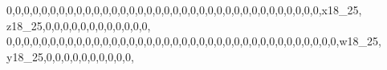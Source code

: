 \documentclass[]{article}
\newenvironment{Shaded}{\begin{snugshade}}{\end{snugshade}}
\newcommand{\DecValTok}[1]{\textcolor[rgb]{0.00,0.00,0.81}{#1}}
\newcommand{\NormalTok}[1]{#1}
\begin{document}
\begin{Shaded}
\begin{Highlighting}[]
\DecValTok{0}\NormalTok{,}\DecValTok{0}\NormalTok{,}\DecValTok{0}\NormalTok{,}\DecValTok{0}\NormalTok{,}\DecValTok{0}\NormalTok{,}\DecValTok{0}\NormalTok{,}\DecValTok{0}\NormalTok{,}\DecValTok{0}\NormalTok{,}\DecValTok{0}\NormalTok{,}\DecValTok{0}\NormalTok{,}\DecValTok{0}\NormalTok{,}\DecValTok{0}\NormalTok{,}\DecValTok{0}\NormalTok{,}\DecValTok{0}\NormalTok{,}\DecValTok{0}\NormalTok{,}\DecValTok{0}\NormalTok{,}\DecValTok{0}\NormalTok{,}\DecValTok{0}\NormalTok{,}\DecValTok{0}\NormalTok{,}\DecValTok{0}\NormalTok{,}\DecValTok{0}\NormalTok{,}\DecValTok{0}\NormalTok{,}\DecValTok{0}\NormalTok{,}\DecValTok{0}\NormalTok{,}\DecValTok{0}\NormalTok{,}\DecValTok{0}\NormalTok{,}\DecValTok{0}\NormalTok{,}\DecValTok{0}\NormalTok{,}\DecValTok{0}\NormalTok{,}\DecValTok{0}\NormalTok{,}\DecValTok{0}\NormalTok{,}\DecValTok{0}\NormalTok{,}\DecValTok{0}\NormalTok{,}\DecValTok{0}\NormalTok{,}\DecValTok{0}\NormalTok{,}\DecValTok{0}\NormalTok{,x18_}\DecValTok{25}\NormalTok{, z18_}\DecValTok{25}\NormalTok{,}\DecValTok{0}\NormalTok{,}\DecValTok{0}\NormalTok{,}\DecValTok{0}\NormalTok{,}\DecValTok{0}\NormalTok{,}\DecValTok{0}\NormalTok{,}\DecValTok{0}\NormalTok{,}\DecValTok{0}\NormalTok{,}\DecValTok{0}\NormalTok{,}\DecValTok{0}\NormalTok{,}\DecValTok{0}\NormalTok{,}\DecValTok{0}\NormalTok{,}\DecValTok{0}\NormalTok{,}
\DecValTok{0}\NormalTok{,}\DecValTok{0}\NormalTok{,}\DecValTok{0}\NormalTok{,}\DecValTok{0}\NormalTok{,}\DecValTok{0}\NormalTok{,}\DecValTok{0}\NormalTok{,}\DecValTok{0}\NormalTok{,}\DecValTok{0}\NormalTok{,}\DecValTok{0}\NormalTok{,}\DecValTok{0}\NormalTok{,}\DecValTok{0}\NormalTok{,}\DecValTok{0}\NormalTok{,}\DecValTok{0}\NormalTok{,}\DecValTok{0}\NormalTok{,}\DecValTok{0}\NormalTok{,}\DecValTok{0}\NormalTok{,}\DecValTok{0}\NormalTok{,}\DecValTok{0}\NormalTok{,}\DecValTok{0}\NormalTok{,}\DecValTok{0}\NormalTok{,}\DecValTok{0}\NormalTok{,}\DecValTok{0}\NormalTok{,}\DecValTok{0}\NormalTok{,}\DecValTok{0}\NormalTok{,}\DecValTok{0}\NormalTok{,}\DecValTok{0}\NormalTok{,}\DecValTok{0}\NormalTok{,}\DecValTok{0}\NormalTok{,}\DecValTok{0}\NormalTok{,}\DecValTok{0}\NormalTok{,}\DecValTok{0}\NormalTok{,}\DecValTok{0}\NormalTok{,}\DecValTok{0}\NormalTok{,}\DecValTok{0}\NormalTok{,}\DecValTok{0}\NormalTok{,}\DecValTok{0}\NormalTok{,}\DecValTok{0}\NormalTok{,}\DecValTok{0}\NormalTok{,w18_}\DecValTok{25}\NormalTok{, y18_}\DecValTok{25}\NormalTok{,}\DecValTok{0}\NormalTok{,}\DecValTok{0}\NormalTok{,}\DecValTok{0}\NormalTok{,}\DecValTok{0}\NormalTok{,}\DecValTok{0}\NormalTok{,}\DecValTok{0}\NormalTok{,}\DecValTok{0}\NormalTok{,}\DecValTok{0}\NormalTok{,}\DecValTok{0}\NormalTok{,}\DecValTok{0}\NormalTok{,}

\end{Highlighting}
\end{Shaded}
\end{document}
